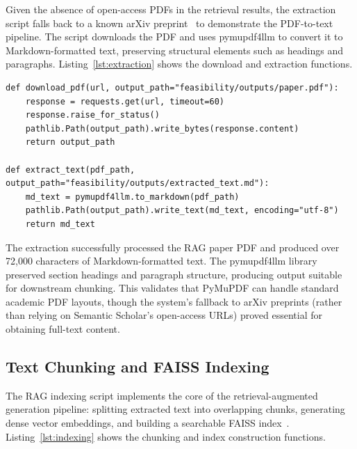 \documentclass[12pt,a4paper]{article}
\begin{document}
Given the absence of open-access PDFs in the retrieval results, the extraction script falls back to a known arXiv preprint~\citep{lewis2020rag} to demonstrate the PDF-to-text pipeline. The script downloads the PDF and uses pymupdf4llm to convert it to Markdown-formatted text, preserving structural elements such as headings and paragraphs. Listing~\ref{lst:extraction} shows the download and extraction functions.

\begin{lstlisting}[caption={PDF download and text extraction using pymupdf4llm},label=lst:extraction]
def download_pdf(url, output_path="feasibility/outputs/paper.pdf"):
    response = requests.get(url, timeout=60)
    response.raise_for_status()
    pathlib.Path(output_path).write_bytes(response.content)
    return output_path

def extract_text(pdf_path, output_path="feasibility/outputs/extracted_text.md"):
    md_text = pymupdf4llm.to_markdown(pdf_path)
    pathlib.Path(output_path).write_text(md_text, encoding="utf-8")
    return md_text
\end{lstlisting}

The extraction successfully processed the RAG paper PDF and produced over 72,000 characters of Markdown-formatted text. The pymupdf4llm library preserved section headings and paragraph structure, producing output suitable for downstream chunking. This validates that PyMuPDF can handle standard academic PDF layouts, though the system's fallback to arXiv preprints (rather than relying on Semantic Scholar's open-access URLs) proved essential for obtaining full-text content.

\subsection{Text Chunking and FAISS Indexing}

The RAG indexing script implements the core of the retrieval-augmented generation pipeline: splitting extracted text into overlapping chunks, generating dense vector embeddings, and building a searchable FAISS index~\citep{johnson2019faiss}. Listing~\ref{lst:indexing} shows the chunking and index construction functions.
\end{document}
